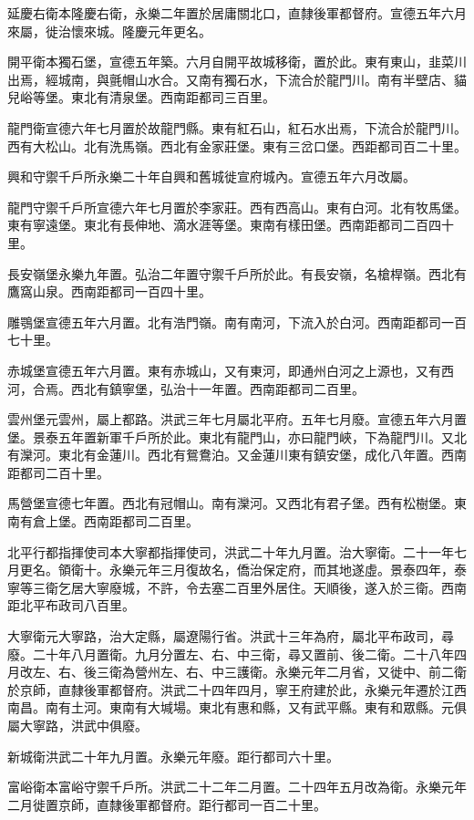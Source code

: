 延慶右衛本隆慶右衛，永樂二年置於居庸關北口，直隸後軍都督府。宣德五年六月來屬，徙治懷來城。隆慶元年更名。

開平衛本獨石堡，宣德五年築。六月自開平故城移衛，置於此。東有東山，韭菜川出焉，經城南，與氈帽山水合。又南有獨石水，下流合於龍門川。南有半壁店、貓兒峪等堡。東北有清泉堡。西南距都司三百里。

龍門衛宣德六年七月置於故龍門縣。東有紅石山，紅石水出焉，下流合於龍門川。西有大松山。北有洗馬嶺。西北有金家莊堡。東有三岔口堡。西距都司百二十里。

興和守禦千戶所永樂二十年自興和舊城徙宣府城內。宣德五年六月改屬。

龍門守禦千戶所宣德六年七月置於李家莊。西有西高山。東有白河。北有牧馬堡。東有寧遠堡。東北有長伸地、滴水涯等堡。東南有樣田堡。西南距都司二百四十里。

長安嶺堡永樂九年置。弘治二年置守禦千戶所於此。有長安嶺，名槍桿嶺。西北有鷹窩山泉。西南距都司一百四十里。

雕鶚堡宣德五年六月置。北有浩門嶺。南有南河，下流入於白河。西南距都司一百七十里。

赤城堡宣德五年六月置。東有赤城山，又有東河，即通州白河之上源也，又有西河，合焉。西北有鎮寧堡，弘治十一年置。西南距都司二百里。

雲州堡元雲州，屬上都路。洪武三年七月屬北平府。五年七月廢。宣德五年六月置堡。景泰五年置新軍千戶所於此。東北有龍門山，亦曰龍門峽，下為龍門川。又北有灤河。東北有金蓮川。西北有鴛鴦泊。又金蓮川東有鎮安堡，成化八年置。西南距都司二百十里。

馬營堡宣德七年置。西北有冠帽山。南有灤河。又西北有君子堡。西有松樹堡。東南有倉上堡。西南距都司二百里。

北平行都指揮使司本大寧都指揮使司，洪武二十年九月置。治大寧衛。二十一年七月更名。領衛十。永樂元年三月復故名，僑治保定府，而其地遂虛。景泰四年，泰寧等三衛乞居大寧廢城，不許，令去塞二百里外居住。天順後，遂入於三衛。西南距北平布政司八百里。

大寧衛元大寧路，治大定縣，屬遼陽行省。洪武十三年為府，屬北平布政司，尋廢。二十年八月置衛。九月分置左、右、中三衛，尋又置前、後二衛。二十八年四月改左、右、後三衛為營州左、右、中三護衛。永樂元年二月省，又徙中、前二衛於京師，直隸後軍都督府。洪武二十四年四月，寧王府建於此，永樂元年遷於江西南昌。南有土河。東南有大堿場。東北有惠和縣，又有武平縣。東有和眾縣。元俱屬大寧路，洪武中俱廢。

新城衛洪武二十年九月置。永樂元年廢。距行都司六十里。

富峪衛本富峪守禦千戶所。洪武二十二年二月置。二十四年五月改為衛。永樂元年二月徙置京師，直隸後軍都督府。距行都司一百二十里。

